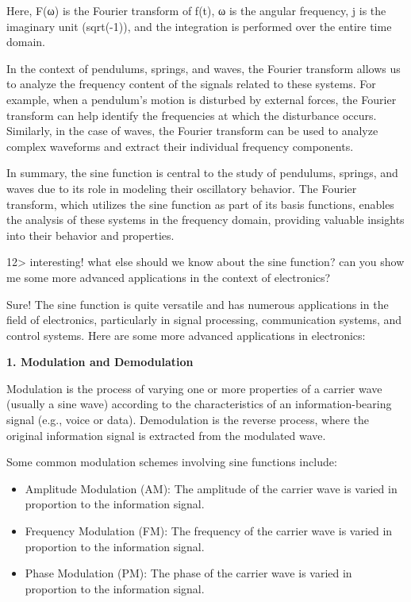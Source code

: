 \documentclass[
]{article}
\begin{document}
Here, F(ω) is the Fourier transform of f(t), ω is the angular frequency,
j is the imaginary unit (sqrt(-1)), and the integration is performed
over the entire time domain.

In the context of pendulums, springs, and waves, the Fourier transform
allows us to analyze the frequency content of the signals related to
these systems. For example, when a pendulum's motion is disturbed by
external forces, the Fourier transform can help identify the frequencies
at which the disturbance occurs. Similarly, in the case of waves, the
Fourier transform can be used to analyze complex waveforms and extract
their individual frequency components.

In summary, the sine function is central to the study of pendulums,
springs, and waves due to its role in modeling their oscillatory
behavior. The Fourier transform, which utilizes the sine function as
part of its basis functions, enables the analysis of these systems in
the frequency domain, providing valuable insights into their behavior
and properties.

12\textgreater{} interesting! what else should we know about the sine
function? can you show me some more advanced applications in the context
of electronics?

Sure! The sine function is quite versatile and has numerous applications
in the field of electronics, particularly in signal processing,
communication systems, and control systems. Here are some more advanced
applications in electronics:

\textbf{1. Modulation and Demodulation}

Modulation is the process of varying one or more properties of a carrier
wave (usually a sine wave) according to the characteristics of an
information-bearing signal (e.g., voice or data). Demodulation is the
reverse process, where the original information signal is extracted from
the modulated wave.

Some common modulation schemes involving sine functions include:

\begin{itemize}
\item
  Amplitude Modulation (AM): The amplitude of the carrier wave is varied
  in proportion to the information signal.
\item
  Frequency Modulation (FM): The frequency of the carrier wave is varied
  in proportion to the information signal.
\item
  Phase Modulation (PM): The phase of the carrier wave is varied in
  proportion to the information signal.
\end{itemize}
\end{document}
